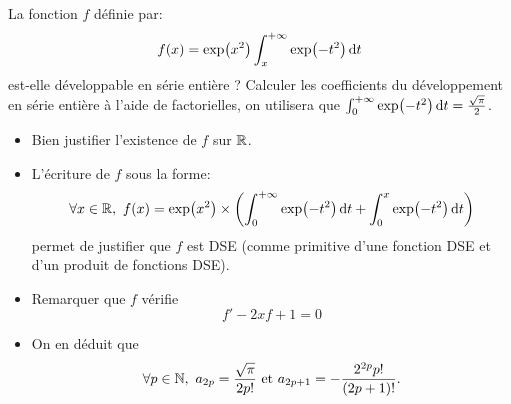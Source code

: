 \begin{exercice}  
    La fonction $f$ définie par:
    $$f(x) = \exp(x^2) \int_{x}^{+ \infty} \exp(-t^2) \, \mathrm{d} t$$
    est-elle développable en série entière ? Calculer les coefficients du développement en série entière à l'aide de factorielles, on utilisera que $\int_{0}^{+\infty} \exp(-t^2) \, \mathrm{d} t = \frac{\sqrt{\pi}}{2}$. 
\end{exercice}

\begin{itemize}
    \item Bien justifier l'existence de $f$ sur $\mathbb{R}$.
    \item L'écriture de $f$ sous la forme:
    $$\forall x \in \mathbb{R},\ f(x) = \exp(x^2) \times \left(\int_{0}^{+ \infty} \exp(-t^2) \, \mathrm{d} t + \int_{0}^{x} \exp(-t^2) \, \mathrm{d} t\right)$$
    permet de justifier que $f$ est DSE (comme primitive d'une fonction DSE et d'un produit de fonctions DSE).
    \item Remarquer que $f$ vérifie
    $$f' -2xf + 1 = 0$$
    \item On en déduit que 
    $$\forall p \in \N,\ a_{2p} = \frac{\sqrt{\pi}}{2p!} \text{ et } a_{2p+1} = -\frac{2^{2p} p!}{(2p+1)!}.$$
\end{itemize}
